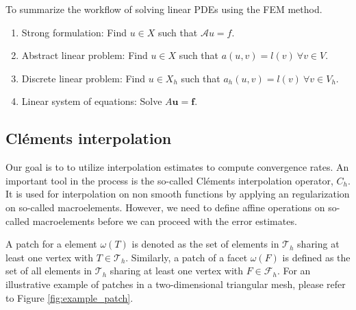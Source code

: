 To summarize the workflow of solving linear PDEs using the FEM method.

\begin{enumerate}[label=\arabic*)]
    \item Strong formulation: Find $u \in X$ such that  $ \mathcal{A} u = f   $.
    \item Abstract linear problem: Find $u \in X$ such that  $a( u,v) = l( v) \  \forall v \in V  $.
    \item Discrete linear problem: Find $u \in X_{h}$ such that  $a_{h}( u,v) = l( v) \  \forall v \in V_{h}  $.
    \item Linear system of equations: Solve $ A \mathbf{u} = \mathbf{f}$.
\end{enumerate}

\subsection{Cléments interpolation}%
\label{ssub:clement_operator}
Our goal is to to utilize interpolation estimates to compute convergence rates. An important tool in the process is the so-called Cléments interpolation operator, $C_{h}$.
It is used for interpolation on non smooth functions by applying an regularization on so-called macroelements. However, we need to define affine operations on so-called macroelements before we can proceed with the error estimates.

A patch for a element $\omega \left( T \right) $ is denoted as the set of elements in $\mathcal{T} _{h}$  sharing at least one vertex with $T \in \mathcal{T} _{h}$. Similarly,  a patch of a facet $\omega \left( F \right) $ is defined as the set of all elements in $\mathcal{T}_{h} $
sharing at least one vertex with $F \in  \mathcal{F} _{h}$. For an illustrative example of patches in a two-dimensional triangular mesh, please refer to Figure \ref{fig:example_patch}.

